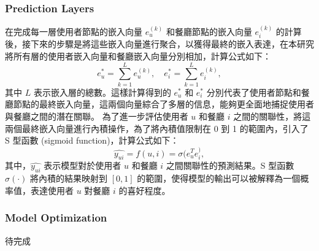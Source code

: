     \subsubsection{Prediction Layers}
    在完成每一層使用者節點的嵌入向量 $e_u^{(k)}$ 和餐廳節點的嵌入向量 $e_i^{(k)}$ 的計算後，接下來的步驟是將這些嵌入向量進行聚合，以獲得最終的嵌入表達，在本研究將所有層的使用者嵌入向量和餐廳嵌入向量分別相加，計算公式如下： 
    \begin{equation} 
        e_u^* = \sum_{k=1}^{L} e_u^{(k)}, \quad e_i^* = \sum_{k=1}^{L} e_i^{(k)}, 
    \end{equation} 
    其中 $L$ 表示嵌入層的總數。這樣計算得到的 $e_u^*$ 和 $e_i^*$ 分別代表了使用者節點和餐廳節點的最終嵌入向量，這兩個向量綜合了多層的信息，能夠更全面地捕捉使用者與餐廳之間的潛在關聯。
    為了進一步評估使用者 $u$ 和餐廳 $i$ 之間的關聯性，將這兩個最終嵌入向量進行內積操作，為了將內積值限制在 0 到 1 的範圍內，引入了 S 型函數 (sigmoid function)，計算公式如下： 
    \begin{equation} 
        \hat{y_{ui}} = f(u, i) = \sigma(e_u^{T} e_i^), 
    \end{equation} 
    其中，$\hat{y_{ui}}$ 表示模型對於使用者 $u$ 和餐廳 $i$ 之間關聯性的預測結果。S 型函數 $\sigma(\cdot)$ 將內積的結果映射到 $[0, 1]$ 的範圍，使得模型的輸出可以被解釋為一個概率值，表達使用者 $u$ 對餐廳 $i$ 的喜好程度。

    \subsubsection{Model Optimization}
    待完成
\color{black}